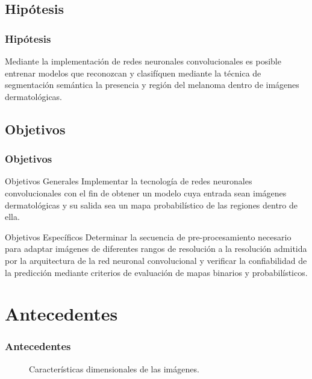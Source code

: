 \documentclass{beamer}
\begin{document}
\subsection{Hipótesis}
\begin{frame}
    \frametitle{Hipótesis}
    Mediante la implementación de redes neuronales convolucionales es posible entrenar modelos que reconozcan y clasifíquen mediante la técnica de segmentación semántica la presencia y región del melanoma dentro de imágenes dermatológicas.
\end{frame}

\subsection{Objetivos}
\begin{frame}
    \frametitle{Objetivos}
    \begin{block}{Objetivos Generales}
        Implementar la tecnología de redes neuronales convolucionales con el fin de obtener un modelo cuya entrada sean imágenes dermatológicas y su salida sea un mapa probabilístico de las regiones dentro de ella.
        
    \end{block}
    \begin{block}{Objetivos Específicos}
        Determinar la secuencia de pre-procesamiento necesario para adaptar imágenes de diferentes rangos de resolución a la resolución admitida por la arquitectura de la red neuronal convolucional y verificar la confiabilidad de la predicción mediante criterios de evaluación de mapas binarios y probabilísticos.
        
    \end{block}
\end{frame}

\section{Antecedentes}

\begin{frame}
\frametitle{Antecedentes}
    \begin{figure}
         \qquad
        \caption{Características dimensionales de las imágenes.}
    \end{figure}
\end{frame}
\end{document}
